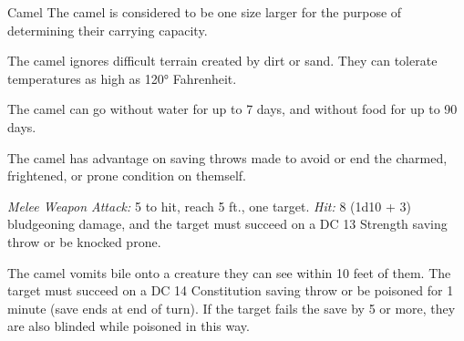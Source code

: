 \documentclass[10pt,a4paper,twoside,bg=print,twocolumn,openany,nodeprecatedcode]{dndbook}
\begin{document}
\begin{DndMonster}[float=t]{Camel}
\DndMonsterBasics[
armor-class = {11},
hit-points = {\DndDice{3d10 + 12}},
speed = {50 ft.}
]
\DndMonsterAbilityScores[
 str = 17,
 dex = 13,
 con = 19,
 int = 4,
 wis = 12,
 cha = 5
]
\DndMonsterDetails[
saving-throws = {Str +5, Con +6},
challenge = 1/2,
]
The camel is considered to be one size larger for the purpose of determining their carrying capacity.

The camel ignores difficult terrain created by dirt or sand. They can tolerate temperatures as high as 120° Fahrenheit.

The camel can go without water for up to 7 days, and without food for up to 90 days.

The camel has advantage on saving throws made to avoid or end the charmed, frightened, or prone condition on themself.

\textsl{Melee Weapon Attack:} 5 to hit, reach 5 ft., one target. \textsl{Hit:} 8 (1d10 + 3) bludgeoning damage, and the target must succeed on a DC 13 Strength saving throw or be knocked prone.

The camel vomits bile onto a creature they can see within 10 feet of them. The target must succeed on a DC 14 Constitution saving throw or be poisoned for 1 minute (save ends at end of turn). If the target fails the save by 5 or more, they are also blinded while poisoned in this way.

\end{DndMonster}
\end{document}
